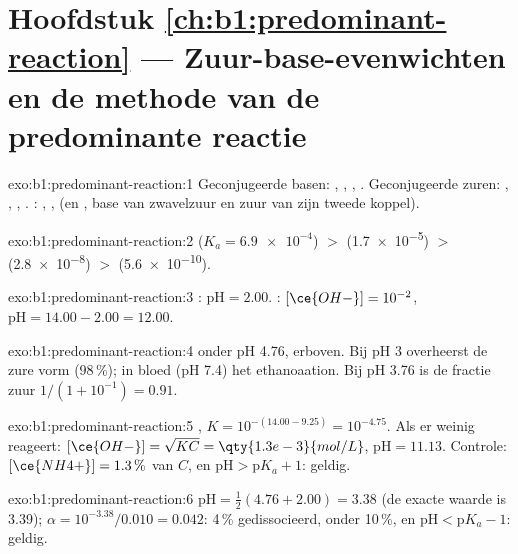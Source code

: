 \section*{Hoofdstuk \ref{ch:b1:predominant-reaction} --- Zuur-base-evenwichten en de methode van de predominante reactie}

\begin{solution}{exo:b1:predominant-reaction:1}
Geconjugeerde basen: , , , .
Geconjugeerde zuren: , , , .
: , ,  (en , base van
zwavelzuur en zuur van zijn tweede koppel).
\end{solution}

\begin{solution}{exo:b1:predominant-reaction:2}
 ($K_a = \num{6.9e-4}$) $>$  (\num{1.7e-5}) $>$ 
(\num{2.8e-8}) $>$  (\num{5.6e-10}).
\end{solution}

\begin{solution}{exo:b1:predominant-reaction:3}
: $\mathrm{pH} = 2.00$. : $[\ce{OH-}] = 10^{-2}$,
$\mathrm{pH} = 14.00 - 2.00 = 12.00$.
\end{solution}

\begin{solution}{exo:b1:predominant-reaction:4}
 onder pH 4.76,  erboven. Bij pH 3 overheerst de
zure vorm (98\,\%); in bloed (pH 7.4) het ethanoaation. Bij pH 3.76 is
de fractie zuur $1/(1 + 10^{-1}) = 0.91$.
\end{solution}

\begin{solution}{exo:b1:predominant-reaction:5}
 , $K = 10^{-(14.00 -
9.25)} = 10^{-4.75}$. Als er weinig  reageert: $[\ce{OH-}] = \sqrt{K C} =
\qty{1.3e-3}{mol/L}$, $\mathrm{pH} = 11.13$. Controle: $[\ce{NH4+}] = 1.3\,\%$
van $C$, en $\mathrm{pH} > \mathrm{p}K_a + 1$: geldig.
\end{solution}

\begin{solution}{exo:b1:predominant-reaction:6}
$\mathrm{pH} = \frac12(4.76 + 2.00) = 3.38$ (de exacte waarde is 3.39);
$\alpha = 10^{-3.38}/0.010 = 0.042$: 4\,\% gedissocieerd, onder 10\,\%,
en $\mathrm{pH} < \mathrm{p}K_a - 1$: geldig.
\end{solution}

